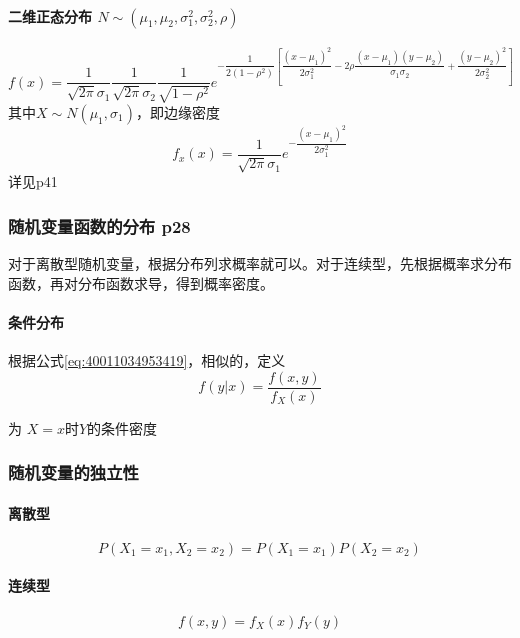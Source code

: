 \paragraph{二维正态分布 $N\sim (\mu_1,\mu_2,\sigma^2_1,\sigma^2_2,\rho )$}
\begin{equation*}
f(x)=\dfrac{1}{\sqrt{2\pi}\sigma_{1}} \dfrac{1}{\sqrt{2\pi}\sigma_{2}}
\dfrac{1}{\sqrt{1-\rho^2}}
e^{
	-\dfrac{1}{2(1-\rho^2)}
	\left[ 
	\dfrac{(x-\mu_{1})^{2}}{2\sigma_{1}^{2}}
	-2\rho\dfrac{(x-\mu_1)(y-\mu_2)}{\sigma_1 \sigma_2}
	+\dfrac{(y-\mu_{2})^{2}}{2\sigma_{2}^{2}}
\right] }
\end{equation*}
其中$X \sim N(\mu_1 ,\sigma_1)$，即边缘密度
\begin{equation*}
f_x(x)=\dfrac{1}{\sqrt{2\pi}\sigma_1}e^{-\dfrac{(x-\mu_1)^{2}}{2\sigma_1^{2}}}
\end{equation*}
详见p41


\subsubsection{随机变量函数的分布 p28}
对于离散型随机变量，根据分布列求概率就可以。对于连续型，先根据概率求分布函数，再对分布函数求导，得到概率密度。

\paragraph{条件分布}

根据公式\ref{eq:40011034953419}，相似的，定义
\begin{equation*}
  f(y|x)=\dfrac{f(x,y)}{f_{X}(x)}
\end{equation*}

为 $X=x$时$Y$的条件密度

\subsubsection{随机变量的独立性}

\paragraph{离散型}
\begin{equation*}
  P(X_{1}=x_{1},X_{2}=x_{2})=P(X_{1}=x_{1})P(X_{2}=x_{2})
\end{equation*}
\paragraph{连续型}
\begin{equation*}
  f(x,y)=f_{X}(x)f_{Y}(y)
\end{equation*}
